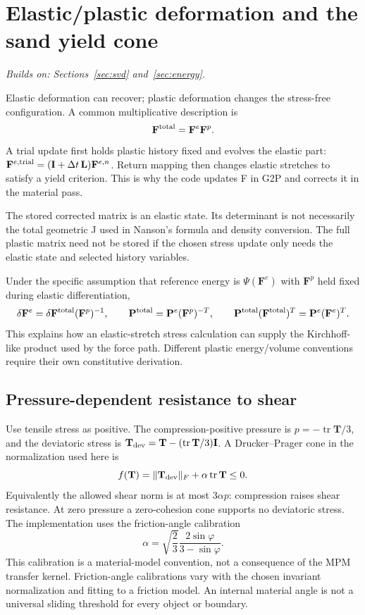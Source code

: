 \documentclass[11pt,a4paper]{article}
\newcommand{\mat}[1]{\mathbf{#1}}
\newcommand{\prereq}[1]{\textit{Builds on: #1}\par}
\DeclareMathOperator{\tr}{tr}
\numberwithin{equation}{section}
\begin{document}
\section{Elastic/plastic deformation and the sand yield cone}\label{sec:plastic}
\prereq{Sections~\ref{sec:svd} and~\ref{sec:energy}.}
Elastic deformation can recover; plastic deformation changes the stress-free
configuration. A common multiplicative description is
\[
\mat F^{\rm total}=\mat F^e\mat F^p.
\]
A trial update first holds plastic history fixed and evolves the elastic part:
$\mat F^{e,\rm trial}=(\mat I+\Delta t\,\mat L)\mat F^{e,n}$.
Return mapping then changes elastic stretches to satisfy a yield criterion.
This is why the code updates F in G2P and corrects it in the material pass.

The stored corrected matrix is an elastic state. Its determinant is not
necessarily the total geometric J used in Nanson's formula and density
conversion. The full plastic matrix need not be stored if the chosen stress
update only needs the elastic state and selected history variables.

Under the specific assumption that reference energy is $\Psi(\mat F^e)$ with
$\mat F^p$ held fixed during elastic differentiation,
\[
\delta\mat F^e=\delta\mat F^{\rm total}(\mat F^p)^{-1},\qquad
\mat P^{\rm total}=\mat P^e(\mat F^p)^{-T},\qquad
\mat P^{\rm total}(\mat F^{\rm total})^T=\mat P^e(\mat F^e)^T.
\]
This explains how an elastic-stretch stress calculation can supply the
Kirchhoff-like product used by the force path. Different plastic energy/volume
conventions require their own constitutive derivation.

\subsection{Pressure-dependent resistance to shear}
Use tensile stress as positive. The compression-positive pressure is
$p=-\tr\mat T/3$, and the deviatoric stress is
$\mat T_{\rm dev}=\mat T-(\tr\mat T/3)\mat I$.
A Drucker--Prager cone in the normalization used here is
\begin{equation}\label{eq:DP}
f(\mat T)=\|\mat T_{\rm dev}\|_F+\alpha\tr\mat T\le0.
\end{equation}
Equivalently the allowed shear norm is at most $3\alpha p$: compression raises
shear resistance. At zero pressure a zero-cohesion cone supports no deviatoric
stress. The implementation uses the friction-angle calibration
\[
\alpha=\sqrt{\frac23}\frac{2\sin\varphi}{3-\sin\varphi}.
\]
This calibration is a material-model convention, not a consequence of the MPM
transfer kernel. Friction-angle calibrations vary with the chosen invariant
normalization and fitting to a friction model. An internal material angle is
not a universal sliding threshold for every object or boundary.
\end{document}
